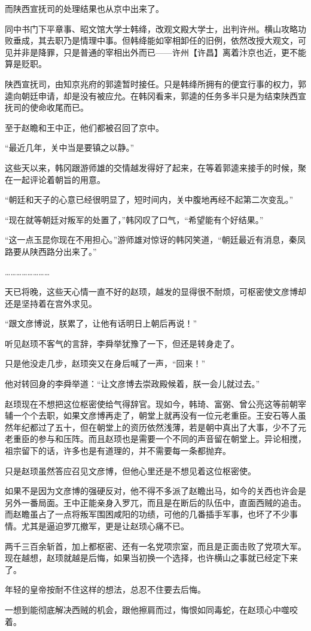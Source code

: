 而陕西宣抚司的处理结果也从京中出来了。

同中书门下平章事、昭文馆大学士韩绛，改观文殿大学士，出判许州。横山攻略功败垂成，其去职乃是情理中事。但韩绛能如宰相卸任的旧例，依然改授大观文，可见并非是降罪，只是普通的宰相出外而已——许州【许昌】离着汴京也近，更不能算是贬职。

陕西宣抚司，由知京兆府的郭逵暂时接任。只是韩绛所拥有的便宜行事的权力，郭逵向朝廷申请，却是没有被应允。在韩冈看来，郭逵的任务多半只是为结束陕西宣抚司的使命收尾而已。

至于赵瞻和王中正，他们都被召回了京中。

“最近几年，关中当是要镇之以静。”

这些天以来，韩冈跟游师雄的交情越发得好了起来，在等着郭逵来接手的时候，聚在一起评论着朝旨的用意。

“朝廷和天子的心意已经很明显了，短时间内，关中腹地再经不起第二次变乱。”

“现在就等朝廷对叛军的处置了，”韩冈叹了口气，“希望能有个好结果。”

“这一点玉昆你现在不用担心。”游师雄对惊讶的韩冈笑道，“朝廷最近有消息，秦凤路要从陕西路分出来了。”

……………………

天已将晚，这些天心情一直不好的赵顼，越发的显得很不耐烦，可枢密使文彦博却还是坚持着在宫外求见。

“跟文彦博说，朕累了，让他有话明日上朝后再说！”

听见赵顼不客气的言辞，李舜举犹豫了一下，但还是转身走了。

只是他没走几步，赵顼突又在身后喊了一声，“回来！”

他对转回身的李舜举道：“让文彦博去崇政殿候着，朕一会儿就过去。”

赵顼现在不想把这位枢密使给气得辞官。现如今，韩琦、富弼、曾公亮这等前朝宰辅一个个去职，如果文彦博再走了，朝堂上就再没有一位元老重臣。王安石等人虽然年纪都过了五十，但在朝堂上的资历依然浅薄，若是朝中真出了大事，少不了元老重臣的参与和压阵。而且赵顼也是需要一个不同的声音留在朝堂上。异论相搅，祖宗留下的话，许多也是有道理的，并不需要每一条都抛弃。

只是赵顼虽然答应召见文彦博，但他心里还是不想见着这位枢密使。

如果不是因为文彦博的强硬反对，他不得不多派了赵瞻出马，如今的关西也许会是另外一番局面。王中正能亲身入罗兀，而且是在断后的队伍中，直面西贼的追击。而赵瞻虽占了一点将叛军围困咸阳的功绩，可他的几番插手军事，也坏了不少事情。尤其是逼迫罗兀撤军，更是让赵顼心痛不已。

两千三百余斩首，加上都枢密、还有一名党项宗室，而且是正面击败了党项大军。现在越想，赵顼就越是后悔，如果当初换一个选择，也许横山之事就已经定下来了。

年轻的皇帝按耐不住这样的想法，总忍不住要去后悔。

一想到能彻底解决西贼的机会，跟他擦肩而过，悔恨如同毒蛇，在赵顼心中噬咬着。

